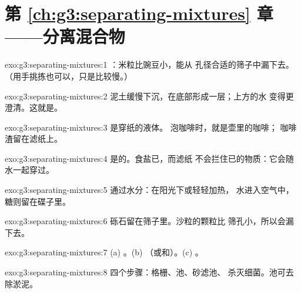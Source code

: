 \section*{第 \ref{ch:g3:separating-mixtures} 章——分离混合物}

\begin{solution}{exo:g3:separating-mixtures:1}
：米粒比豌豆小，能从
孔径合适的筛子中漏下去。（用手挑拣也可以，只是比较慢。）
\end{solution}

\begin{solution}{exo:g3:separating-mixtures:2}
泥土缓慢下沉，在底部形成一层；上方的水
变得更澄清。这就是。
\end{solution}

\begin{solution}{exo:g3:separating-mixtures:3}
是穿纸的液体。
泡咖啡时，就是壶里的咖啡；
咖啡渣留在滤纸上。
\end{solution}

\begin{solution}{exo:g3:separating-mixtures:4}
是的。食盐已，而滤纸
不会拦住已的物质：它会随水一起穿过。
\end{solution}

\begin{solution}{exo:g3:separating-mixtures:5}
通过水分：在阳光下或轻轻加热，
水进入空气中，糖则留在碟子里。
\end{solution}

\begin{solution}{exo:g3:separating-mixtures:6}
砾石留在筛子里。沙粒的颗粒比
筛孔小，所以会漏下去。
\end{solution}

\begin{solution}{exo:g3:separating-mixtures:7}
(a) 。(b) （或和）。(c) 。
\end{solution}

\begin{solution}{exo:g3:separating-mixtures:8}
四个步骤：格栅、池、砂滤池、
杀灭细菌。池可去除淤泥。
\end{solution}

